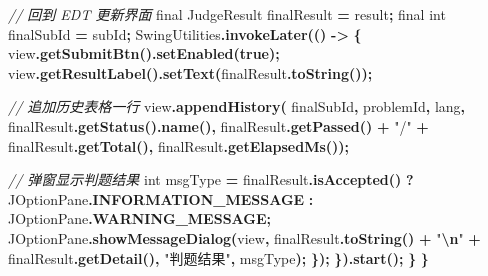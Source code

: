 \documentclass[
  11pt,
]{ctexart}
\newenvironment{Shaded}{\begin{snugshade}}{\end{snugshade}}
\newcommand{\BuiltInTok}[1]{#1}
\newcommand{\CommentTok}[1]{\textcolor[rgb]{0.56,0.35,0.01}{\textit{#1}}}
\newcommand{\DataTypeTok}[1]{\textcolor[rgb]{0.13,0.29,0.53}{#1}}
\newcommand{\FunctionTok}[1]{\textcolor[rgb]{0.13,0.29,0.53}{\textbf{#1}}}
\newcommand{\KeywordTok}[1]{\textcolor[rgb]{0.13,0.29,0.53}{\textbf{#1}}}
\newcommand{\NormalTok}[1]{#1}
\newcommand{\OperatorTok}[1]{\textcolor[rgb]{0.81,0.36,0.00}{\textbf{#1}}}
\newcommand{\SpecialCharTok}[1]{\textcolor[rgb]{0.81,0.36,0.00}{\textbf{#1}}}
\newcommand{\StringTok}[1]{\textcolor[rgb]{0.31,0.60,0.02}{#1}}
\begin{document}
\begin{Shaded}
\begin{Highlighting}[]
            \CommentTok{// 回到 EDT 更新界面}
            \DataTypeTok{final}\NormalTok{ JudgeResult finalResult }\OperatorTok{=}\NormalTok{ result}\OperatorTok{;}
            \DataTypeTok{final} \DataTypeTok{int}\NormalTok{         finalSubId  }\OperatorTok{=}\NormalTok{ subId}\OperatorTok{;}
            \BuiltInTok{SwingUtilities}\OperatorTok{.}\FunctionTok{invokeLater}\OperatorTok{(()} \OperatorTok{{-}\textgreater{}} \OperatorTok{\{}
\NormalTok{                view}\OperatorTok{.}\FunctionTok{getSubmitBtn}\OperatorTok{().}\FunctionTok{setEnabled}\OperatorTok{(}\KeywordTok{true}\OperatorTok{);}
\NormalTok{                view}\OperatorTok{.}\FunctionTok{getResultLabel}\OperatorTok{().}\FunctionTok{setText}\OperatorTok{(}\NormalTok{finalResult}\OperatorTok{.}\FunctionTok{toString}\OperatorTok{());}

                \CommentTok{// 追加历史表格一行}
\NormalTok{                view}\OperatorTok{.}\FunctionTok{appendHistory}\OperatorTok{(}
\NormalTok{                    finalSubId}\OperatorTok{,}\NormalTok{ problemId}\OperatorTok{,}\NormalTok{ lang}\OperatorTok{,}
\NormalTok{                    finalResult}\OperatorTok{.}\FunctionTok{getStatus}\OperatorTok{().}\FunctionTok{name}\OperatorTok{(),}
\NormalTok{                    finalResult}\OperatorTok{.}\FunctionTok{getPassed}\OperatorTok{()} \OperatorTok{+} \StringTok{"/"} \OperatorTok{+}\NormalTok{ finalResult}\OperatorTok{.}\FunctionTok{getTotal}\OperatorTok{(),}
\NormalTok{                    finalResult}\OperatorTok{.}\FunctionTok{getElapsedMs}\OperatorTok{());}

                \CommentTok{// 弹窗显示判题结果}
                \DataTypeTok{int}\NormalTok{ msgType }\OperatorTok{=}\NormalTok{ finalResult}\OperatorTok{.}\FunctionTok{isAccepted}\OperatorTok{()}
                    \OperatorTok{?} \BuiltInTok{JOptionPane}\OperatorTok{.}\FunctionTok{INFORMATION\_MESSAGE}
                    \OperatorTok{:} \BuiltInTok{JOptionPane}\OperatorTok{.}\FunctionTok{WARNING\_MESSAGE}\OperatorTok{;}
                \BuiltInTok{JOptionPane}\OperatorTok{.}\FunctionTok{showMessageDialog}\OperatorTok{(}\NormalTok{view}\OperatorTok{,}
\NormalTok{                    finalResult}\OperatorTok{.}\FunctionTok{toString}\OperatorTok{()} \OperatorTok{+} \StringTok{"}\SpecialCharTok{\textbackslash{}n}\StringTok{"} \OperatorTok{+}\NormalTok{ finalResult}\OperatorTok{.}\FunctionTok{getDetail}\OperatorTok{(),}
                    \StringTok{"判题结果"}\OperatorTok{,}\NormalTok{ msgType}\OperatorTok{);}
            \OperatorTok{\});}
        \OperatorTok{\}).}\FunctionTok{start}\OperatorTok{();}
    \OperatorTok{\}}
\OperatorTok{\}}
\end{Highlighting}
\end{Shaded}
\end{document}
